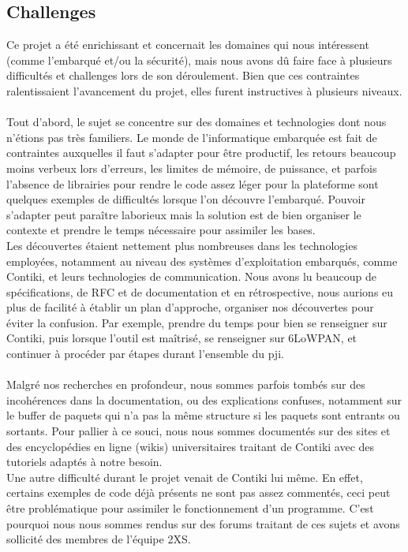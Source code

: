 	\subsection{Challenges} %
	 Ce projet a été enrichissant et concernait les domaines qui nous intéressent (comme l'embarqué et/ou la sécurité), mais nous avons dû faire face à plusieurs difficultés et challenges lors de son déroulement. Bien que ces contraintes ralentissaient l'avancement du projet, elles furent instructives à plusieurs niveaux.\\\\
	 Tout d'abord, le sujet se concentre sur des domaines et technologies dont nous n'étions pas très familiers. Le monde de l'informatique embarquée est fait de contraintes auxquelles il faut s'adapter pour être productif, les retours beaucoup moins verbeux lors d'erreurs, les limites de mémoire, de puissance, et parfois l'absence de librairies pour rendre le code assez léger pour la plateforme sont quelques exemples de difficultés lorsque l'on découvre l'embarqué. Pouvoir s'adapter peut paraître laborieux mais la solution est de bien organiser le contexte et prendre le temps nécessaire pour assimiler les bases.\\
	 
	 Les découvertes étaient nettement plus nombreuses dans les technologies employées, notamment au niveau des systèmes d'exploitation embarqués, comme Contiki, et leurs technologies de communication. Nous avons lu beaucoup de spécifications, de RFC et de documentation et en rétrospective, nous aurions eu plus de facilité à établir un plan d'approche, organiser nos découvertes pour éviter la confusion. Par exemple, prendre du temps pour bien se renseigner sur Contiki, puis lorsque l'outil est maîtrisé, se renseigner sur 6LoWPAN, et continuer à procéder par étapes durant l'ensemble du pji.\\\\
	 Malgré nos recherches en profondeur, nous sommes parfois tombés sur des incohérences dans la documentation, ou des explications confuses, notamment sur le buffer de paquets qui n'a pas la même structure si les paquets sont entrants ou sortants. Pour pallier à ce souci, nous nous sommes documentés sur des sites et des encyclopédies en ligne (wikis) universitaires traitant de Contiki avec des tutoriels adaptés à notre besoin.\\
	 
	 Une autre difficulté durant le projet venait de Contiki lui même. En effet, certains exemples de code déjà présents ne sont pas assez commentés, ceci peut être problématique pour assimiler le fonctionnement d'un programme. C'est pourquoi nous nous sommes rendus sur des forums traitant de ces sujets et avons sollicité des membres de l'équipe 2XS.


